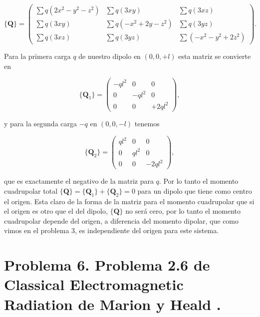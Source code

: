 \documentclass[a4paper,11pt]{article}
\numberwithin{equation}{section}
\begin{document}
\begin{equation}
 \{ \mathbf{Q} \} = \begin{pmatrix}
                     \sum q(2x^2 - y^2 - z^2) & \sum q(3xy) & \sum q(3xz) \\
                     \sum q(3xy) & \sum q(-x^2 + 2y - z^2) & \sum q(3yz) \\
                     \sum q(3xz) & \sum q(3yz) & \sum(-x^2 - y^2 + 2z^2)
                    \end{pmatrix}.
\end{equation}

Para la primera carga $q$ de nuestro dipolo en $(0,0,+l)$ esta matriz se convierte en 

\begin{equation}
 \{ \mathbf{Q}_1 \} = \begin{pmatrix}
                     -ql^2 & 0 & 0 \\
                     0 & -ql^2 & 0 \\
                     0 & 0 & +2ql^2
                    \end{pmatrix},
\end{equation}

y para la segunda carga $-q$ en $(0,0,-l)$ tenemos 

\begin{equation}
 \{ \mathbf{Q}_2 \} = \begin{pmatrix}
                     ql^2 & 0 & 0 \\
                     0 & ql^2 & 0 \\
                     0 & 0 & -2ql^2
                    \end{pmatrix},
\end{equation}

que es exactamente el negativo de la matriz para $q$. Por lo tanto el momento cuadrupolar 
total $\{ \mathbf{Q} \} = \{ \mathbf{Q}_1 \} + \{ \mathbf{Q}_2 \} = 0$ para un dipolo 
que tiene como centro el origen. Esta claro de la forma de la matriz para el momento 
cuadrupolar que si el origen es otro que el del dipolo, $\{ \mathbf{Q} \}$ no será 
cero, por lo tanto el momento cuadrupolar depende del origen, a diferencia del momento 
dipolar, que como vimos en el problema 3, es independiente del origen para este sistema.

\section{Problema 6. Problema 2.6 de Classical Electromagnetic Radiation
de Marion y Heald \cite{marion2}.}
\end{document}

